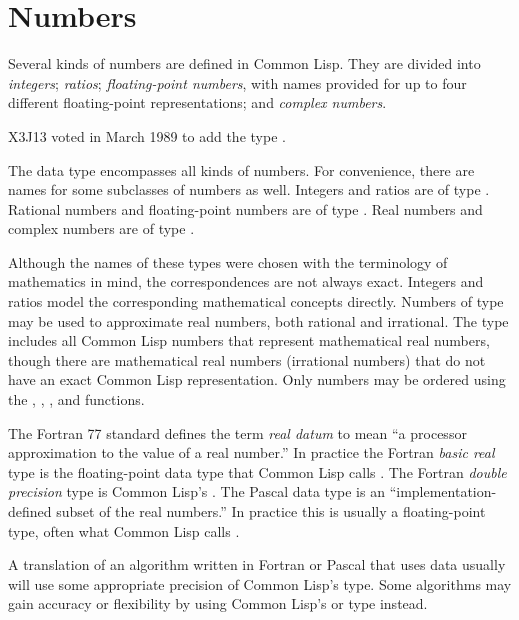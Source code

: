 \section{Numbers}

Several kinds of numbers are defined in Common Lisp.
They are divided into {\it integers}; {\it ratios};
{\it floating-point numbers}, with names provided for
up to four different floating-point representations; and {\it complex numbers}.

\begin{newer}
X3J13 voted in March 1989  to add the type .

The  data type encompasses all kinds of
             numbers.  For convenience, there are names for some
             subclasses of numbers as well.  Integers and ratios are of
             type .  Rational numbers and floating-point
             numbers are of type .  Real numbers and complex
             numbers are of type .

             Although the names of these types were chosen with the
             terminology of mathematics in mind, the correspondences
             are not always exact.  Integers and ratios model the
             corresponding mathematical concepts directly.  Numbers
             of type  may be used to approximate real
             numbers, both rational and irrational.  The  type
             includes all Common Lisp numbers that represent
             mathematical real numbers, though there are
             mathematical real numbers (irrational numbers)
             that do not have an exact Common Lisp representation.
             Only  numbers may be ordered using the \cd{<}, \cd{>}, \cd{<=},
             and \cd{>=} functions.

\beforenoterule
\begin{incompatibility}
The Fortran 77 standard defines the term
             {\it real datum} to mean ``a processor approximation to the value
             of a real number.''  In practice the Fortran {\it basic real} type
             is the floating-point data type that Common Lisp calls
             .  The Fortran {\it double precision} type is
             Common Lisp's .  The Pascal  data type is
             an ``implementation-defined subset of the real numbers.''  In
             practice this is usually a floating-point type, often what
             Common Lisp calls .

             A translation of an algorithm written in Fortran or Pascal
             that uses  data usually will use some appropriate
             precision of Common Lisp's  type.  Some algorithms may
             gain accuracy or flexibility by using Common Lisp's
              or  type instead.
\end{incompatibility}
\afternoterule
\end{newer}

